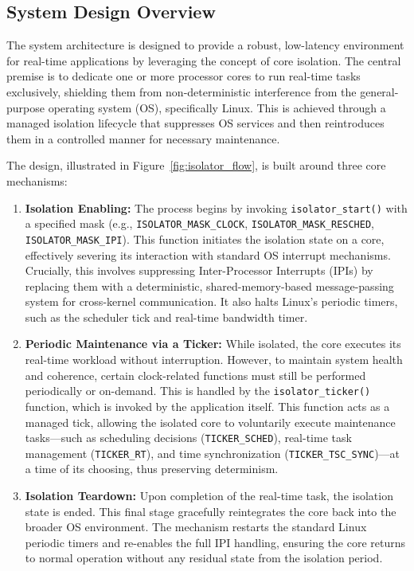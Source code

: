 \documentclass[letterpaper]{article}
\begin{document}
\subsection{System Design Overview}
\label{subsec:system-design}

The system architecture is designed to provide a robust, low-latency environment for real-time applications by leveraging the concept of core isolation. The central premise is to dedicate one or more processor cores to run real-time tasks exclusively, shielding them from non-deterministic interference from the general-purpose operating system (OS), specifically Linux. This is achieved through a managed isolation lifecycle that suppresses OS services and then reintroduces them in a controlled manner for necessary maintenance.

The design, illustrated in Figure~\ref{fig:isolator_flow}, is built around three core mechanisms:

\begin{enumerate}
    \item \textbf{Isolation Enabling:} The process begins by invoking \texttt{isolator\_start()} with a specified mask (e.g., \texttt{ISOLATOR\_MASK\_CLOCK}, \texttt{ISOLATOR\_MASK\_RESCHED}, \texttt{ISOLATOR\_MASK\_IPI}). This function initiates the isolation state on a core, effectively severing its interaction with standard OS interrupt mechanisms. Crucially, this involves suppressing Inter-Processor Interrupts (IPIs) by replacing them with a deterministic, shared-memory-based message-passing system for cross-kernel communication. It also halts Linux's periodic timers, such as the scheduler tick and real-time bandwidth timer.

    \item \textbf{Periodic Maintenance via a Ticker:} While isolated, the core executes its real-time workload without interruption. However, to maintain system health and coherence, certain clock-related functions must still be performed periodically or on-demand. This is handled by the \texttt{isolator\_ticker()} function, which is invoked by the application itself. This function acts as a managed tick, allowing the isolated core to voluntarily execute maintenance tasks---such as scheduling decisions (\texttt{TICKER\_SCHED}), real-time task management (\texttt{TICKER\_RT}), and time synchronization (\texttt{TICKER\_TSC\_SYNC})---at a time of its choosing, thus preserving determinism.

    \item \textbf{Isolation Teardown:} Upon completion of the real-time task, the isolation state is ended. This final stage gracefully reintegrates the core back into the broader OS environment. The mechanism restarts the standard Linux periodic timers and re-enables the full IPI handling, ensuring the core returns to normal operation without any residual state from the isolation period.
\end{enumerate}
\end{document}
